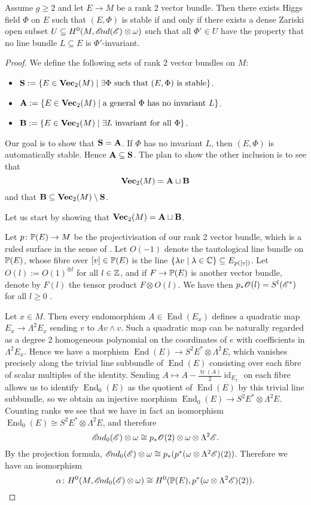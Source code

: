 \documentclass[A4paper, 12pt, british, reqno]{amsart}
\DeclareMathOperator{\End}{End}
\DeclareMathOperator{\id}{id}
\newcommand{\ot}{\otimes}
\newcommand{\dual}{^{*}}
\begin{document}
\begin{prop}
    Assume $g\geqslant 2$ and let $E\to M$ be a rank $2$ vector bundle.
    Then there exists Higgs field $\Phi$ on $E$ such that $(E,\Phi)$ is stable if and only if there exists a dense Zariski open subset $U\subseteq H^{0}(M,\sEnd(\E)\ot \w)$ such that all $\Phi'\in U$ have the property that no line bundle $L\subseteq E$ is $\Phi'$-invariant.
    \begin{proof}
	We define the following sets of rank $2$ vector bundles on $M$:
	\begin{itemize}
	    \item $\bfS:=\{ E\in \Vec_{2}(M)\mid \exists \Phi \text{ such that }(E,\Phi)\text{ is stable}\}$.
	    \item $\bfA:=\{ E\in \Vec_{2}(M)\mid \text{a general }\Phi\text{ has no invariant }L \}$.
	    \item $\bfB:=\{ E\in \Vec_{2}(M)\mid \exists L\text{ invariant for all }\Phi\}$.
	\end{itemize}

	Our goal is to show that $\bfS=\bfA$.
	If $\Phi$ has no invariant $L$, then $(E,\Phi)$ is automatically stable.
	Hence $\bfA\subseteq \bfS$.
	The plan to show the other inclusion is to see that
	\[ \Vec_{2}(M)=\bfA\sqcup \bfB \]
	and that $\bfB\subseteq \Vec_{2}(M)\setminus \bfS$.
	
	Let us start by showing that $\Vec_{2}(M)=\bfA\sqcup \bfB$.

	Let $p\colon \P(E)\to M$ be the projectivisation of our rank 2 vector bundle, which is a ruled surface in the sense of \cite[\S V.2]{har77}.
	Let $O(-1)$ denote the tautological line bundle on $\P(E)$, whose fibre over $[v]\in \P(E)$ is the line $\{\lambda v \mid \lambda\in \C\}\subseteq E_{p([v])}$.
	Let $O(l):=O(1)^{\ot l}$ for all $l\in \Z$, and if $F\to \P(E)$ is another vector bundle, denote by $F(l)$ the tensor product $F\ot O(l)$.
	We have then $p_{*}\O(l)=S^{l}(\E\dual)$ for all $l\geqslant 0$ \cite[Exercise III.8.4]{har77}.

	Let $x\in M$.
	Then every endomorphism $A\in \End(E_{x})$ defines a quadratic map $E_{x}\to \Lambda^{2}E_{x}$ sending $v$ to $Av\wedge v$.
	Such a quadratic map can be naturally regarded as a degree $2$ homogeneous polynomial on the coordinates of $e$ with coefficients in $\Lambda^{2}E_{x}$.
	Hence we have a morphism $\End(E)\to S^{2}E\dual \ot \Lambda^{2}E$, which vanishes precisely along the trivial line subbundle of $\End(E)$ consisting over each fibre of scalar multiples of the identity.
	Sending $A\mapsto A-\frac{\operatorname{tr}(A)}{2}\id_{E_{x}}$ on each fibre allows us to identify $\End_{0}(E)$ as the quotient of $\End(E)$ by this trivial line subbundle, so we obtain an injective morphism $\End_{0}(E)\to S^{2}E\dual \ot \Lambda^{2}E$.
	Counting ranks we see that we have in fact an isomorphism $\End_{0}(E)\cong S^{2}E\dual \ot \Lambda^{2}E$, and therefore
	\[ \sEnd_{0}(\E)\ot \w\cong p_{*}\O(2)\ot \w\ot \Lambda^{2}\E. \]
	By the projection formula, $\sEnd_{0}(\E)\ot \w\cong p_{*}(p^{*}(\w\ot \Lambda^{2}\E)(2))$.
	Therefore we have an isomorphism
	\[ \alpha \colon H^{0}(M,\sEnd_{0}(\E)\ot \w)\cong H^{0}(\P(E),p^{*}(\w\ot \Lambda^{2}\E)(2)). \]


\end{proof}
\end{prop}
\end{document}
